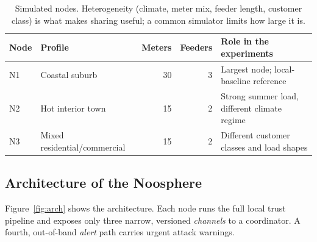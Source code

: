 \documentclass[11pt,a4paper]{article}
\newcommand{\hdr}{\rowcolor{emblue!15}}
\begin{document}
\begin{table}[H]
\centering\small
\caption{Simulated nodes. Heterogeneity (climate, meter mix, feeder length, customer class) is what makes sharing useful; a common simulator limits how large it is.}
\label{tab:nodes}
\begin{tabularx}{\textwidth}{@{}l Y r r Y@{}}
\toprule\hdr
Node & Profile & Meters & Feeders & Role in the experiments \\
\midrule
N1 & Coastal suburb & 30 & 3 & Largest node; local-baseline reference \\
N2 & Hot interior town & 15 & 2 & Strong summer load, different climate regime \\
N3 & Mixed residential/commercial & 15 & 2 & Different customer classes and load shapes \\
\bottomrule
\end{tabularx}
\end{table}

\subsection{Architecture of the Noosphere}

Figure~\ref{fig:arch} shows the architecture. Each node runs the full local trust pipeline and exposes only three narrow, versioned \emph{channels} to a coordinator. A fourth, out-of-band \emph{alert} path carries urgent attack warnings.
\end{document}
